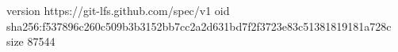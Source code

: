 version https://git-lfs.github.com/spec/v1
oid sha256:f537896c260c509b3b3152bb7cc2a2d631bd7f2f3723e83c51381819181a728c
size 87544
